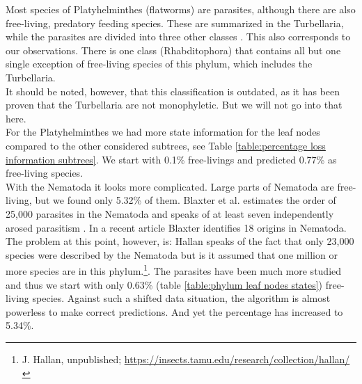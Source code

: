       Most species of Platyhelminthes (flatworms) are parasites, although there are also free-living, 
        predatory feeding species. These are summarized in the Turbellaria, while the parasites are 
        divided into three other classes \cite{Ax1961}. This also corresponds to our observations. There 
        is one class (Rhabditophora) that contains all but one single exception of free-living species 
        of this phylum, which includes the Turbellaria. \\
      It should be noted, however, that this classification is outdated, as it has been proven that 
        the Turbellaria are not monophyletic. But we will not go into that here. \\
      For the Platyhelminthes we had more state information for the leaf nodes compared to the other 
        considered subtrees, see Table \ref{table:percentage loss information subtrees}. We start with 
        0.1\% free-livings and predicted 0.77\% as free-living species. \\

      With the Nematoda it looks more complicated. Large parts of Nematoda are free-living, but we 
        found only 5.32\% of them. Blaxter et al. estimates the order of 25,000 parasites in the 
        Nematoda \cite{Blaxter2015} and speaks of at least seven independently arosed parasitism 
        \cite{Blaxter1998}. In a recent article Blaxter identifies 18 origins \cite{Blaxter2015} in 
        Nematoda. \\
      The problem at this point, however, is: Hallan speaks of the fact that only 23,000 species 
        were described by the Nematoda but is it assumed that one million or more species are in this 
        phylum.\footnote{J. Hallan, unpublished; 
          \hyperlink{https://insects.tamu.edu/research/collection/hallan/}
          {https://insects.tamu.edu/research/collection/hallan/}
        }.  The parasites have been much more studied and thus we start 
        with only 0.63\% (table \ref{table:phylum leaf nodes states}) free-living species. Against such 
        a shifted data situation, the algorithm is almost powerless to make correct predictions. And yet 
        the percentage has increased to 5.34\%. \\


